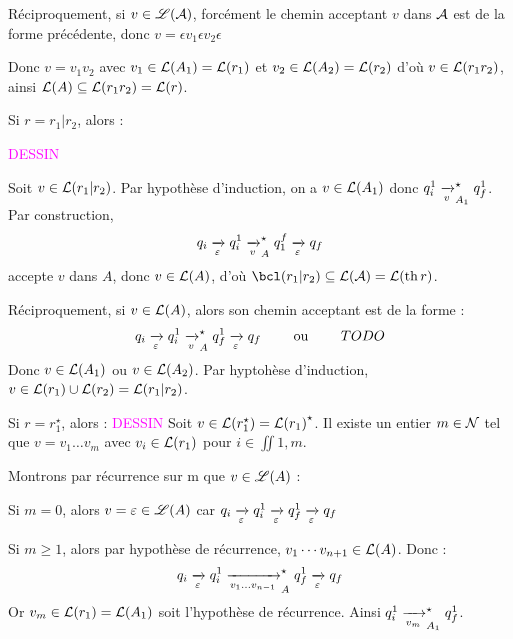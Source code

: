 \begin{nproof}
\begin{enumerate}
        
        Réciproquement, si $v\in \mathscr{L}(\mathcal{A})$, forcément le chemin acceptant $v$ dans $\mathcal{A}$ est de la forme précédente, donc $v= \epsilon v_1 \epsilon v_2  \epsilon $
        
        
        Donc $v = v_1v_2$ avec $v_1 \in \mathcal{L}\!\left(A_1\right) = \mathcal{L}\!\left(r_1\right)$ et $v_2 \in \mathcal{L}\!\left(A_2\right) = \mathcal{L}\!\left(r_2\right)$ d'où $v \in \mathcal{L}\!\left(r_1r_2\right)$, ainsi $\mathcal{L}\!\left(A\right) \subseteq \mathcal{L}\!\left(r_1r_2\right) = \mathcal{L}\!\left(r\right)$.
        
            \itt Si $r = r_1 \vert r_2$, alors :
            
            \textcolor{magenta}{DESSIN}
            
            Soit $v \in \mathcal{L}\!\left(r_1 \vert r_2\right)$. Par hypothèse d'induction, on a $v \in \mathcal{L}\!\left(A_1\right)$ donc $q_i^1 \lima{v}_{A_1}^\star q_f^1$. Par construction, 
            \[ q_i \lima{\epsilon} q_i^1 \lima{v}_A^\star q_1^f \lima{\epsilon} q_f\]
            accepte $v$ dans $A$, donc $v \in \mathcal{L}\!\left(A\right)$, d'où $\bcl\p{r_1 \vert r_2} \subseteq \bcL\p{\bcA} = \bcL\p{\th r}$.
            
            Réciproquement, si $v \in \mathcal{L}\!\left(A\right)$, alors son chemin acceptant est de la forme :
            \[ q_i \lima{\epsilon} q_i^1 \lima{v}_{A}^\star q_f^1 \lima{\epsilon} q_f \qquad\ou\qquad TODO\]
            Donc $v \in \mathcal{L}\!\left(A_1\right)$ ou $v \in \mathcal{L}\!\left(A_2\right)$. Par hyptohèse d'induction, $v \in \mathcal{L}\!\left(r_1\right) \cup \mathcal{L}\!\left(r_2\right) = \mathcal{L}\!\left(r_1 \vert r_2\right)$.
            
            \itt Si $r = r_1^\star$, alors :
            \textcolor{magenta}{\Huge{DESSIN}}
            Soit $v \in \mathcal{L}\!\left(r_1^\star\right) = \mathcal{L}\!\left(r_1\right)^\star$. Il existe un entier $m \in \mathcal{N}$ tel que $v = v_1 \dots v_m$ avec $v_i \in \mathcal{L}\!\left(r_1\right)$ pour $i \in \iint{1, m}$.
            
            Montrons par récurrence sur m que $v \in \mathscr{L} \!\left(A\right)$ :
            \begin{enumerate}
                \ithand Si $m = 0$, alors $v = \varepsilon \in \mathscr{L} \!\left(A\right)$ car $q_i \lima{\epsilon} q_i^1 \lima{\epsilon} q_f^1 \lima{\epsilon}  q_f$
                    
                \ithand Si $m \geq 1$, alors par hypothèse de récurrence, $v_1\cdots v_{n+1} \in \mathcal{L}\!\left(A\right)$. Donc :
                \[ q_i \lima{\epsilon} q_i^1 \lima{v_1\dots v_{n-1}}_A^\star q_f^1 \lima{\epsilon} q_f\]
                Or $v_m \in \mathcal{L}\!\left(r_1\right) = \mathcal{L}\!\left(A_1\right)$ soit l'hypothèse de récurrence. Ainsi $q_i^1 \lima{v_m}_{A_1}^\star q_f^1$.
            \end{enumerate}
                

\end{enumerate}
\end{nproof}
